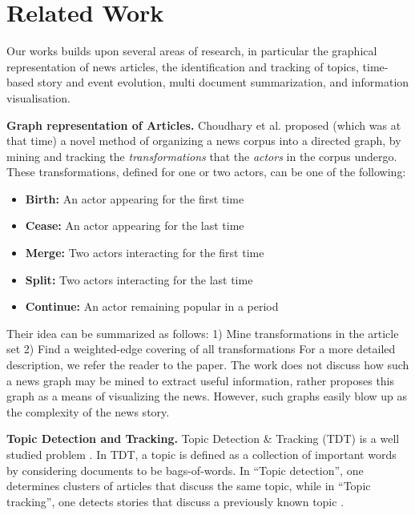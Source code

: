 \section{Related Work}
\label{sec:related}

Our works builds upon several areas of research, in particular the graphical representation of news articles, the identification and tracking of topics, time-based story and event evolution, multi document summarization, and information visualisation.

\textbf{Graph representation of Articles.} Choudhary et al.\cite{choudhary@ecir2008} proposed (which was at that time) a novel method of organizing a news corpus into a directed graph, by mining and tracking the \emph{transformations} that the \emph{actors} in the corpus undergo. These transformations, defined for one or two actors, can be one of the following:
\begin{itemize}
  \item \textbf{Birth:} An actor appearing for the first time
  \item \textbf{Cease:} An actor appearing for the last time
  \item \textbf{Merge:} Two actors interacting for the first time
  \item \textbf{Split:} Two actors interacting for the last time
  \item \textbf{Continue:} An actor remaining popular in a period
\end{itemize}
Their idea can be summarized as follows: 1) Mine transformations in the article set 2) Find a weighted-edge covering of all transformations
For a more detailed description, we refer the reader to the paper. The work does not discuss how such a news graph may be mined to extract
useful information, rather proposes this graph as a means of visualizing the news. However, such graphs easily blow up as the complexity
of the news story. 

\textbf{Topic Detection and Tracking.} Topic Detection \& Tracking (TDT) is a well studied problem \cite{springerlink:10.1023/B:INRT.0000011210.12953.86, springerlink:10.1007, Franz:2001:USC:383952.384013}. In TDT, a topic is defined as a collection of important words by considering documents to be bags-of-words. In ``Topic detection'', one determines clusters of articles that discuss the same topic, while in ``Topic tracking'', one detects stories that discuss a previously known topic \cite{Allan:2002:TDT:772260}. 

